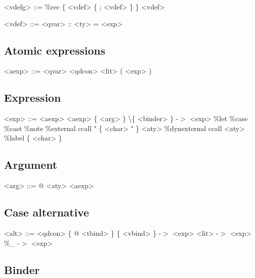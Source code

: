 \begin{grammar}
<vdefg> ::= \%rec \{ <vdef> \{ ; <vdef> \} \}
       \alt <vdef>
\end{grammar}

\begin{grammar}
<vdef> ::= <qvar> :: <ty> = <exp>
\end{grammar}

\subsection*{Atomic expressions}

\begin{grammar}
<aexp> ::= <qvar>
      \alt <qdcon>
      \alt <lit>
      \alt ( <exp> )
\end{grammar}

\subsection*{Expression}

\begin{grammar}
<exp> ::= <aexp>
     \alt <aexp> \{ <arg> \}
     \alt \textbackslash \{ <binder> \} -$>$ <exp>
     \alt \%let 
     \alt \%case
     \alt \%cast
     \alt \%note
     \alt \%external ccall " \{ <char> " \} <aty>
     \alt \%dynexternal ccall <aty>
     \alt \%label \{ <char> \}
\end{grammar}

\subsection*{Argument}

\begin{grammar}
<arg> ::= @ <aty>
     \alt <aexp>
\end{grammar}

\subsection*{Case alternative}

\begin{grammar}
<alt> ::= <qdcon> \{ @ <tbind> \} \{ <vbind> \} -$>$ <exp>
     \alt <lit> -$>$ <exp>
     \alt \%\_ -$>$ <exp>
\end{grammar}

\subsection*{Binder}

